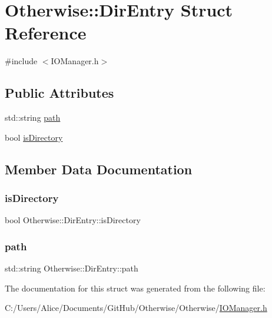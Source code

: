 \hypertarget{struct_otherwise_1_1_dir_entry}{}\section{Otherwise\+:\+:Dir\+Entry Struct Reference}
\label{struct_otherwise_1_1_dir_entry}


{\ttfamily \#include $<$I\+O\+Manager.\+h$>$}

\subsection*{Public Attributes}
\begin{DoxyCompactItemize}
\item 
std\+::string \hyperlink{struct_otherwise_1_1_dir_entry_a81d73bd1506dc07229feddc39f65cb82}{path}
\item 
bool \hyperlink{struct_otherwise_1_1_dir_entry_a45db964c830ef4817d4fe2eb2fb5d5ca}{is\+Directory}
\end{DoxyCompactItemize}


\subsection{Member Data Documentation}
\mbox{\label{struct_otherwise_1_1_dir_entry_a45db964c830ef4817d4fe2eb2fb5d5ca}} 
\subsubsection{\texorpdfstring{is\+Directory}{isDirectory}}
{\footnotesize\ttfamily bool Otherwise\+::\+Dir\+Entry\+::is\+Directory}

\mbox{\label{struct_otherwise_1_1_dir_entry_a81d73bd1506dc07229feddc39f65cb82}} 
\subsubsection{\texorpdfstring{path}{path}}
{\footnotesize\ttfamily std\+::string Otherwise\+::\+Dir\+Entry\+::path}



The documentation for this struct was generated from the following file\+:\begin{DoxyCompactItemize}
\item 
C\+:/\+Users/\+Alice/\+Documents/\+Git\+Hub/\+Otherwise/\+Otherwise/\hyperlink{_i_o_manager_8h}{I\+O\+Manager.\+h}\end{DoxyCompactItemize}
